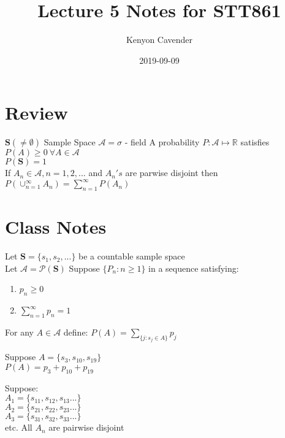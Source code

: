 \documentclass[12pt, oneside, letterpaper]{notes}
\begin{document}
\title{Lecture 5 Notes for STT861}
\author{Kenyon Cavender}
\date{2019-09-09}
\maketitle

\section{Review}
$\textbf{S} (\neq \emptyset)$ Sample Space
$\mathscr{A} = \sigma$ - field
A probability $P: \mathscr{A} \mapsto \mathbb{R}$ satisfies
	\index $P(A) \geq 0 \: \forall A \in \mathscr{A} $\\
	\index $P(\textbf{S}) = 1$ \\
	\index If $A_n \in \mathscr{A}, n=1, 2, ...$ and $A_n's$ are parwise disjoint
	then $P(\cup_{n=1}^{\infty} A_n) = \sum_{n=1}^{\infty} P(A_n)$

\section{Class Notes}
\begin{myex}
	Let $\textbf{S} = \{s_1, s_2, ...\}$ be a countable sample  space \\
	Let $\mathscr{A} = \mathscr{P}(\textbf{S})$
	Suppose $\{P_n : n \geq 1\} $ in a sequence satisfying:
	\begin{enumerate}
		\item $p_n \geq 0$ 
		\item $\sum_{n=1}^{\infty}p_n = 1$
	\end{enumerate}
	For any $A \in \mathscr{A}$ define: $P(A) = \sum_{\{j: s_j \in A\}} p_j $

\begin{remark}
	Suppose $A = \{s_3, s_{10}, s_{19} \}$ \\
	$P(A) = p_3 + p_{10} + p_{19}$ \\
	\vspace{5pt}
	
	Suppose: \\	
	$A_1 = \{s_{11}, s_{12}, s_{13} ... \}$ \\
	$A_2 = \{s_{21}, s_{22}, s_{23} ... \}$ \\
	$A_3 = \{s_{31}, s_{32}, s_{33} ... \}$ \\
	etc. All $A_n$ are pairwise disjoint



\end{remark}

\end{myex}
\end{document}
